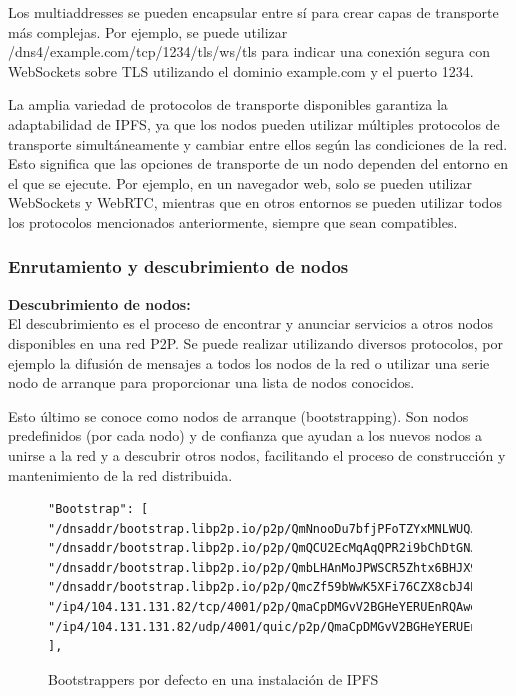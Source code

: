 Los multiaddresses se pueden encapsular entre sí para crear capas de transporte más complejas. Por ejemplo, se puede utilizar /dns4/example.com/tcp/1234/tls/ws/tls para indicar una conexión segura con WebSockets sobre TLS utilizando el dominio example.com y el puerto 1234.

La amplia variedad de protocolos de transporte disponibles garantiza la adaptabilidad de IPFS, ya que los nodos pueden utilizar múltiples protocolos de transporte simultáneamente y cambiar entre ellos según las condiciones de la red. Esto significa que las opciones de transporte de un nodo dependen del entorno en el que se ejecute. Por ejemplo, en un navegador web, solo se pueden utilizar WebSockets y WebRTC, mientras que en otros entornos se pueden utilizar todos los protocolos mencionados anteriormente, siempre que sean compatibles.

\subsubsection{Enrutamiento y descubrimiento de nodos}
\textbf{Descubrimiento de nodos:}
\\El descubrimiento es el proceso de encontrar y anunciar servicios a otros nodos disponibles en una red P2P. Se puede realizar utilizando diversos protocolos,
por ejemplo la difusión de mensajes a todos los nodos de la red o utilizar una serie nodo de arranque para proporcionar una lista de nodos conocidos.

Esto último se conoce como nodos de arranque (bootstrapping). Son nodos predefinidos (por cada nodo) y de confianza que ayudan a los nuevos nodos a unirse a la red y a descubrir otros nodos, facilitando el proceso de construcción y mantenimiento de la red distribuida.

\begin{figure}[H]
      \centering
      \small
      \begin{verbatim}
"Bootstrap": [
"/dnsaddr/bootstrap.libp2p.io/p2p/QmNnooDu7bfjPFoTZYxMNLWUQJyrVwtbZg5gBMjTezGAJN",
"/dnsaddr/bootstrap.libp2p.io/p2p/QmQCU2EcMqAqQPR2i9bChDtGNJchTbq5TbXJJ16u19uLTa",
"/dnsaddr/bootstrap.libp2p.io/p2p/QmbLHAnMoJPWSCR5Zhtx6BHJX9KiKNN6tpvbUcqanj75Nb",
"/dnsaddr/bootstrap.libp2p.io/p2p/QmcZf59bWwK5XFi76CZX8cbJ4BhTzzA3gU1ZjYZcYW3dwt",
"/ip4/104.131.131.82/tcp/4001/p2p/QmaCpDMGvV2BGHeYERUEnRQAwe3N8SzbUtfsmvsqQLuvuJ",
"/ip4/104.131.131.82/udp/4001/quic/p2p/QmaCpDMGvV2BGHeYERUEnRQAwe3N8SzbUtfsmvsqQLuvuJ"
],
      \end{verbatim}
      \caption{Bootstrappers por defecto en una instalación de IPFS}
      \label{}
\end{figure}

